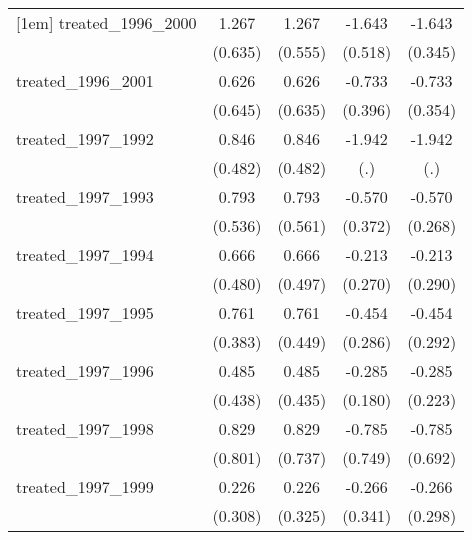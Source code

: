 {\begin{tabular}{l*{4}{c}}
[1em]
treated\_1996\_2000&       1.267\sym{*}  &       1.267\sym{*}  &      -1.643\sym{**} &      -1.643\sym{***}\\
            &     (0.635)         &     (0.555)         &     (0.518)         &     (0.345)         \\
[1em]
treated\_1996\_2001&       0.626         &       0.626         &      -0.733         &      -0.733\sym{*}  \\
            &     (0.645)         &     (0.635)         &     (0.396)         &     (0.354)         \\
[1em]
treated\_1997\_1992&       0.846         &       0.846         &      -1.942         &      -1.942         \\
            &     (0.482)         &     (0.482)         &         (.)         &         (.)         \\
[1em]
treated\_1997\_1993&       0.793         &       0.793         &      -0.570         &      -0.570\sym{*}  \\
            &     (0.536)         &     (0.561)         &     (0.372)         &     (0.268)         \\
[1em]
treated\_1997\_1994&       0.666         &       0.666         &      -0.213         &      -0.213         \\
            &     (0.480)         &     (0.497)         &     (0.270)         &     (0.290)         \\
[1em]
treated\_1997\_1995&       0.761\sym{*}  &       0.761         &      -0.454         &      -0.454         \\
            &     (0.383)         &     (0.449)         &     (0.286)         &     (0.292)         \\
[1em]
treated\_1997\_1996&       0.485         &       0.485         &      -0.285         &      -0.285         \\
            &     (0.438)         &     (0.435)         &     (0.180)         &     (0.223)         \\
[1em]
treated\_1997\_1998&       0.829         &       0.829         &      -0.785         &      -0.785         \\
            &     (0.801)         &     (0.737)         &     (0.749)         &     (0.692)         \\
[1em]
treated\_1997\_1999&       0.226         &       0.226         &      -0.266         &      -0.266         \\
            &     (0.308)         &     (0.325)         &     (0.341)         &     (0.298)         \\

\end{tabular}}
